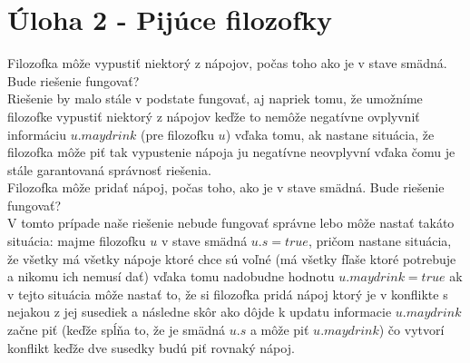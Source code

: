 \documentclass[a4paper]{article}
\begin{document}
\section{Úloha 2 - Pijúce filozofky}

Filozofka môže vypustiť niektorý z nápojov, počas toho ako je v stave smädná. Bude riešenie fungovať?
\\

Riešenie by malo stále v podstate fungovať, aj napriek tomu, že umožníme filozofke vypustiť niektorý z nápojov keďže to nemôže negatívne ovplyvniť informáciu $u.maydrink$ (pre filozofku $u$) vďaka tomu, ak nastane situácia, že filozofka môže piť tak vypustenie nápoja ju negatívne neovplyvní vďaka čomu je stále garantovaná správnosť riešenia.
\\

Filozofka môže pridať nápoj, počas toho, ako je v stave smädná. Bude riešenie fungovať?
\\

V tomto prípade naše riešenie nebude fungovať správne lebo môže nastať takáto situácia: majme filozofku $u$ v stave smädná $u.s = true$, pričom nastane situácia, že všetky má všetky nápoje ktoré chce sú voľné (má všetky fľaše ktoré potrebuje a nikomu ich nemusí dať) vďaka tomu nadobudne hodnotu $u.maydrink = true$ ak v tejto situácia môže nastať to, že si filozofka pridá nápoj ktorý je v konflikte s nejakou z jej susediek a následne skôr ako dôjde k updatu informacie $u.maydrink$ začne piť (keďže spĺňa to, že je smädná $u.s$ a môže piť $u.maydrink$) čo vytvorí konflikt keďže dve susedky budú piť rovnaký nápoj.
\end{document}
